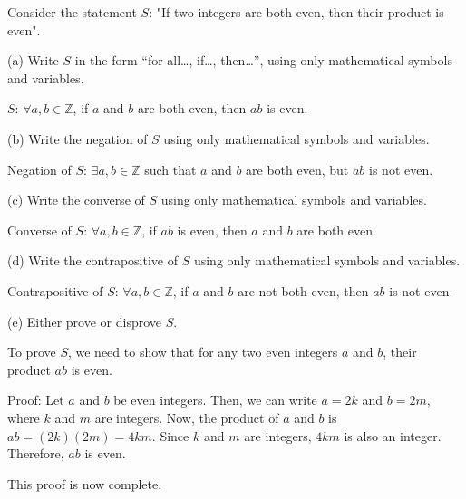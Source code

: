 \documentclass{article}
\begin{document}
Consider the statement $S$: "If two integers are both even, then their product is even".

(a) Write $S$ in the form ``for all\ldots, if\ldots, then\ldots'', using only mathematical symbols and variables.

$S$: $\forall a, b \in \mathbb{Z}$, if $a$ and $b$ are both even, then $ab$ is even.

(b) Write the negation of $S$ using only mathematical symbols and variables.

Negation of $S$: $\exists a, b \in \mathbb{Z}$ such that $a$ and $b$ are both even, but $ab$ is not even.

(c) Write the converse of $S$ using only mathematical symbols and variables.

Converse of $S$: $\forall a, b \in \mathbb{Z}$, if $ab$ is even, then $a$ and $b$ are both even.

(d) Write the contrapositive of $S$ using only mathematical symbols and variables.

Contrapositive of $S$: $\forall a, b \in \mathbb{Z}$, if $a$ and $b$ are not both even, then $ab$ is not even.

(e) Either prove or disprove $S$.

To prove $S$, we need to show that for any two even integers $a$ and $b$, their product $ab$ is even.

Proof: Let $a$ and $b$ be even integers. Then, we can write $a = 2k$ and $b = 2m$, where $k$ and $m$ are integers. Now, the product of $a$ and $b$ is $ab = (2k)(2m) = 4km$. Since $k$ and $m$ are integers, $4km$ is also an integer. Therefore, $ab$ is even.

This proof is now complete.
\end{document}
